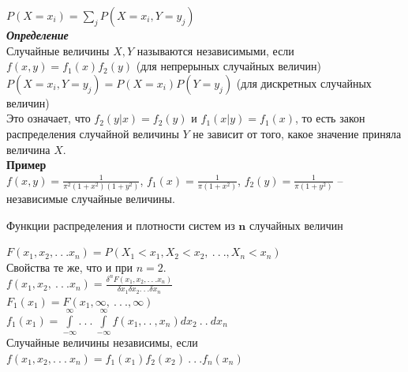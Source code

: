 \documentclass[russian, 12pt, fleqn]{article}
\begin{document}
$P(X=x_i) =  \sum\limits_{j} P(X=x_i, Y=y_j)$\\
\textit{\textbf{Определение}}\\
Случайные величины $X, Y$ называются независимыми, если $f(x, y) = f_1(x)f_2(y)$ (для непрерыных случайных величин)\\
$ P(X = x_i, Y = y_j) = P(X=x_i) P(Y=y_j)$ (для дискретных случайных  величин)\\
Это означает, что $f_2(y|x) = f_2(y)$ и $f_1(x|y) = f_1(x)$, то есть закон распределения случайной величины $Y$ не зависит от того, какое значение приняла величина $X$.\\
\textbf{Пример} \\
$f(x, y) = \frac{1}{\pi^2(1+x^2)(1+y^2)}$, $f_1(x) = \frac{1}{\pi(1+x^2)}$, $f_2(y) = \frac{1}{\pi(1+y^2)}$ -- независимые случайные величины.
\begin{center}
$\textbf{Функции распределения и плотности систем из n случайных величин}$\\
\end{center}
 $F(x_1, x_2, .\ .\ . x_n) = P(X_1 < x_1, X_2 < x_2,\ .\ .\ .,X_n < x_n)$\\
Свойства те же, что и при $n = 2$.\\
$f(x_1, x_2, \ .\ .\ .x_n) = \frac{\delta^nF(x_1, x_2, .\ .\ . x_n)}{\delta x_1 \delta x_2 .\ .\ . \delta x_n}$ \\
$F_1(x_1) = F(x_1, \infty, \ .\ .\ ., \infty)$\\
$f_1(x_1) =  \displaystyle{\int \limits_{-\infty}^{\infty}}.\ .\ .\  \displaystyle{\int \limits_{-\infty}^{\infty}} f(x_1, .\  .\ , x_n) dx_2\ .\ .\ dx_n$\\
Случайные величины независимы, если $f(x_1, x_2, .\ .\ .\ x_n)  = f_1(x_1)  f_2(x_2)\ .\ .\ . f_n(x_n)$\\
\end{document}
